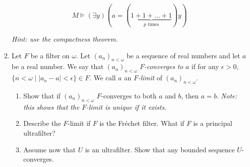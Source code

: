 \documentclass{amsart}
\theoremstyle{definition}
\begin{document}
\begin{enumerate}
  $$
  M \models (\exists y)( a = (\underbrace{1 + 1 + \ldots + 1}_{p \text{ times}}) y)
  $$

  \emph{Hint: use the compactness theorem.}
\item Let $F$ be a filter on $\omega$. Let $(a_n)_{n < \omega}$ be a sequence of real numbers and let $a$ be a real number. We say that $(a_n)_{n < \omega}$ \emph{$F$-converges to $a$} if for any $\epsilon > 0$, $\{n < \omega \mid |a_n - a| < \epsilon\} \in F$. We call $a$ an \emph{$F$-limit} of $(a_n)_{n < \omega}$.

  \begin{enumerate}
  \item Show that if $(a_n)_{n < \omega}$ $F$-converges to both $a$ and $b$, then $a = b$. \emph{Note: this shows that the $F$-limit is unique if it exists.}
  \item Describe the $F$-limit if $F$ is the Fréchet filter. What if $F$ is a principal ultrafilter?
  \item Assume now that $U$ is an ultrafilter. Show that any bounded sequence $U$-converges.
  \end{enumerate}
\end{enumerate}



\end{document}
